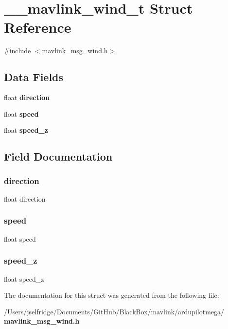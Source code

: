 \section{\+\_\+\+\_\+mavlink\+\_\+wind\+\_\+t Struct Reference}
\label{struct____mavlink__wind__t}


{\ttfamily \#include $<$mavlink\+\_\+msg\+\_\+wind.\+h$>$}

\subsection*{Data Fields}
\begin{DoxyCompactItemize}
\item 
float \textbf{ direction}
\item 
float \textbf{ speed}
\item 
float \textbf{ speed\+\_\+z}
\end{DoxyCompactItemize}


\subsection{Field Documentation}
\mbox{\label{struct____mavlink__wind__t_a8f54e9f41016004732115c10e844deb8}} 
\subsubsection{direction}
{\footnotesize\ttfamily float direction}

\mbox{\label{struct____mavlink__wind__t_a7f7e4724cf57d59513b39c5ecc81adc8}} 
\subsubsection{speed}
{\footnotesize\ttfamily float speed}

\mbox{\label{struct____mavlink__wind__t_a8b18ed841e978673030989a2c9d1c702}} 
\subsubsection{speed\+\_\+z}
{\footnotesize\ttfamily float speed\+\_\+z}



The documentation for this struct was generated from the following file\+:\begin{DoxyCompactItemize}
\item 
/\+Users/jselfridge/\+Documents/\+Git\+Hub/\+Black\+Box/mavlink/ardupilotmega/\textbf{ mavlink\+\_\+msg\+\_\+wind.\+h}\end{DoxyCompactItemize}
